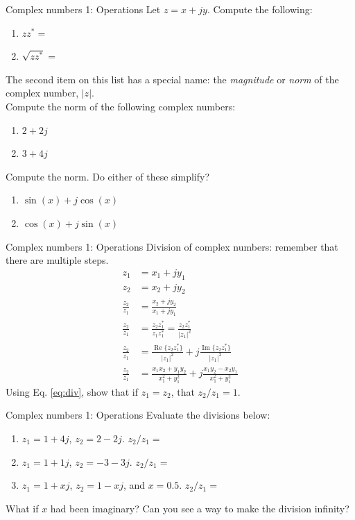 \documentclass{beamer}
\begin{document}
\begin{frame}{Complex numbers 1: Operations}
\small
Let $z = x+jy$.  Compute the following:
\begin{enumerate}
\item $zz^* = $
\item $\sqrt{zz^*} = $
\end{enumerate}
The second item on this list has a special name: the \textit{magnitude} or \textit{norm} of the complex number, $|z|$. \\ \vspace{0.5cm}
Compute the norm of the following complex numbers:
\begin{enumerate}
\item $2+2j$
\item $3+4j$
\end{enumerate}
Compute the norm.  Do either of these simplify?
\begin{enumerate}
\item $\sin(x)+j\cos(x)$
\item $\cos(x)+j\sin(x)$
\end{enumerate}
\end{frame}

\begin{frame}{Complex numbers 1: Operations}
Division of complex numbers: remember that there are multiple steps.
\begin{align}
z_1 &= x_1 + j y_1 \\
z_2 &= x_2 + j y_2 \\
\frac{z_2}{z_1} &= \frac{x_2 + j y_2}{x_1 + j y_1} \\
\frac{z_2}{z_1} &= \frac{z_2 z_1^*}{z_1z_1^*} = \frac{z_2 z_1^*}{|z_1|^2} \\
\frac{z_2}{z_1} &= \frac{\operatorname{Re} \lbrace{z_2 z_1^*}\rbrace}{|z_1|^2} + j \frac{\operatorname{Im} \lbrace{z_2 z_1^*}\rbrace}{|z_1|^2} \\
\frac{z_2}{z_1} &= \frac{x_1 x_2 + y_1 y_2}{x_1^2 + y_1^2} + j \frac{x_1 y_2 - x_2 y_1}{x_1^2 + y_1^2} \label{eq:div}
\end{align}
Using Eq. \ref{eq:div}, show that if $z_1 = z_2$, that $z_2/z_1 = 1$.
\end{frame}

\begin{frame}{Complex numbers 1: Operations}
Evaluate the divisions below:
\begin{enumerate}
\item $z_1 = 1+4j$, $z_2 = 2-2j$.  $z_2/z_1 = $
\item $z_1 = 1+1j$, $z_2 = -3-3j$.  $z_2/z_1 = $
\item $z_1 = 1+xj$, $z_2 = 1-xj$, and $x = 0.5$.  $z_2/z_1 = $
\end{enumerate}
What if $x$ had been imaginary?  Can you see a way to make the division infinity?
\end{frame}
\end{document}
